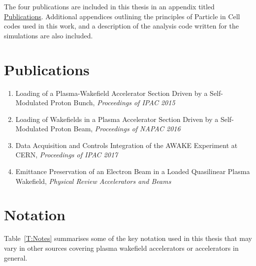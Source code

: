 The four publications are included in this thesis in an appendix titled \hyperref[A:Pub]{Publications}.
Additional appendices outlining the principles of Particle in Cell codes used in this work, and a description of the analysis code written for the simulations are also included.

\section*{Publications}

\begin{enumerate}[I]
    \item Loading of a Plasma-Wakefield Accelerator Section Driven by a Self-Modulated Proton Bunch, \textit{Proceedings of IPAC 2015} \cite{berglyd_olsen:2015}
    \item Loading of Wakefields in a Plasma Accelerator Section Driven by a Self-Modulated Proton Beam, \textit{Proceedings of NAPAC 2016} \cite{berglyd_olsen:2016}
    \item Data Acquisition and Controls Integration of the AWAKE Experiment at CERN, \textit{Proceedings of IPAC 2017} \cite{berglyd_olsen:2017}
    \item Emittance Preservation of an Electron Beam in a Loaded Quasilinear Plasma Wakefield, \textit{Physical Review Accelerators and Beams} \cite{berglyd_olsen:2018}
\end{enumerate}

\section*{Notation}

Table~\ref{T:Notes} summarises some of the key notation used in this thesis that may vary in other sources covering plasma wakefield accelerators or accelerators in general.

